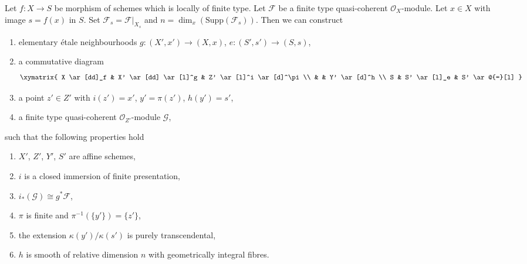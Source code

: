 \begin{lemma}
\label{lemma-elementary-devissage}
Let $f : X \to S$ be morphism of schemes which is locally of finite type.
Let $\mathcal{F}$ be a finite type quasi-coherent $\mathcal{O}_X$-module.
Let $x \in X$ with image $s = f(x)$ in $S$.
Set $\mathcal{F}_s = \mathcal{F}|_{X_s}$ and
$n = \dim_x(\text{Supp}(\mathcal{F}_s))$.
Then we can construct
\begin{enumerate}
\item elementary \'etale neighbourhoods $g : (X', x') \to (X, x)$,
$e : (S', s') \to (S, s)$,
\item a commutative diagram
$$
\xymatrix{
X \ar[dd]_f & X' \ar[dd] \ar[l]^g & Z' \ar[l]^i \ar[d]^\pi \\
& & Y' \ar[d]^h \\
S & S' \ar[l]_e & S' \ar@{=}[l]
}
$$
\item a point $z' \in Z'$ with $i(z') = x'$, $y' = \pi(z')$, $h(y') = s'$,
\item a finite type quasi-coherent $\mathcal{O}_{Z'}$-module $\mathcal{G}$,
\end{enumerate}
such that the following properties hold
\begin{enumerate}
\item $X'$, $Z'$, $Y'$, $S'$ are affine schemes,
\item $i$ is a closed immersion of finite presentation,
\item $i_*(\mathcal{G}) \cong g^*\mathcal{F}$,
\item $\pi$ is finite and $\pi^{-1}(\{y'\}) = \{z'\}$,
\item the extension $\kappa(y')/\kappa(s')$ is purely transcendental,
\item $h$ is smooth of relative dimension $n$
with geometrically integral fibres.
\end{enumerate}
\end{lemma}


